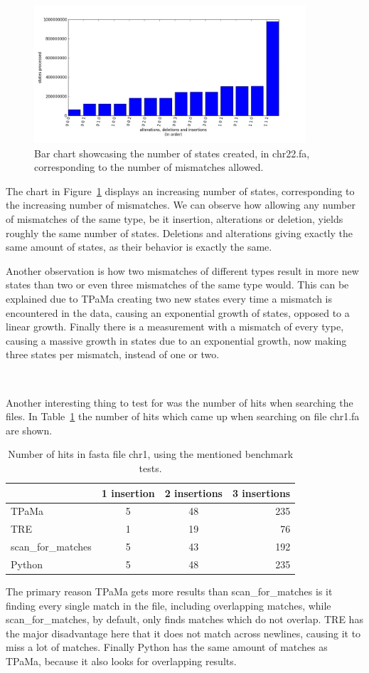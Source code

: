 \begin{figure}[h!]
\centering
\includegraphics[width=0.9\textwidth]{Benchmarking/states_graph.png}
\caption{Bar chart showcasing the number of states created, in chr22.fa, corresponding to the number of mismatches allowed.}
\label{fig:statesgraph}
\end{figure}

The chart in Figure~\ref{fig:statesgraph} displays an increasing number of states, corresponding to the increasing number of mismatches. We can observe how allowing any number of mismatches of the same type, be it insertion, alterations or deletion, yields roughly the same number of states. Deletions and alterations giving exactly the same amount of states, as their behavior is exactly the same.

Another observation is how two mismatches of different types result in more new states than two or even three mismatches of the same type would. This can be explained due to TPaMa creating two new states every time a mismatch is encountered in the data, causing an exponential growth of states, opposed to a linear growth. Finally there is a measurement with a mismatch of every type, causing a massive growth in states due to an exponential growth, now making three states per mismatch, instead of one or two.  

~

Another interesting thing to test for was the number of hits when searching the files. In Table~\ref{tab:hits} the number of hits which came up when searching on file chr1.fa are shown.

\begin{table}[h!]
\centering
\begin{tabular}{ l | c c r }
& 1 insertion & 2 insertions & 3 insertions\\
\hline
TPaMa& 5 &  48 & 235 \\
TRE& 1 & 19 & 76 \\
scan\_for\_matches & 5 & 43  & 192 \\
Python & 5 & 48 & 235
\end{tabular}
\caption{Number of hits in fasta file chr1, using the mentioned benchmark tests.}
\label{tab:hits}
\end{table}

The primary reason TPaMa gets more results than scan\_for\_matches is it finding every single match in the file, including overlapping matches, while scan\_for\_matches, by default, only finds matches which do not overlap. TRE has the major disadvantage here that it does not match across newlines, causing it to miss a lot of matches. Finally Python has the same amount of matches as TPaMa, because it also looks for overlapping results.